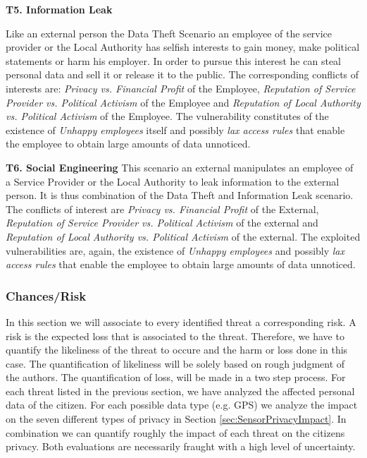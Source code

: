 \documentclass[runningheads,a4paper]{llncs}
\begin{document}
\textbf{T5. Information Leak}

Like an external person the Data Theft Scenario an employee of the
service provider or the Local Authority has selfish interests to gain
money, make political statements or harm his employer.  In order to
pursue this interest he can steal personal data and sell it or release
it to the public.  The corresponding conflicts of interests are:
\textit{Privacy vs. Financial Profit} of the Employee, \textit{Reputation of Service
  Provider vs. Political Activism} of the Employee and \textit{Reputation of Local
  Authority vs. Political Activism} of the Employee.  The vulnerability constitutes of
the existence of \textit{Unhappy employees} itself and possibly \textit{lax access
rules} that enable the employee to obtain large amounts of data
unnoticed.

\textbf{T6. Social Engineering}
This scenario an external manipulates an employee of a Service
Provider or the Local Authority to leak information to the external
person.  It is thus combination of the Data Theft and Information Leak
scenario.
The conflicts of interest are \textit{Privacy vs. Financial Profit} of
the External, \textit{Reputation of Service Provider vs. Political
  Activism} of the external and \textit{Reputation of Local Authority
  vs. Political Activism} of the external.  The exploited
vulnerabilities are, again, the existence of \textit{Unhappy
  employees} and possibly \textit{lax access rules} that enable the
employee to obtain large amounts of data unnoticed.


\subsubsection{Chances/Risk}

In this section we will associate to every identified threat a corresponding risk. A risk is the expected loss that is associated to the threat.
Therefore, we have to quantify the likeliness of the threat to occure and the harm or loss done in this case.
The quantification of likeliness will be solely based on rough judgment of the authors.
The quantification of loss, will be made in a two step process.
For each threat listed in the previous section, we have analyzed the affected personal data of the citizen.
For each possible data type (e.g. GPS) we analyze the impact on the seven different types of privacy in Section \ref{sec:SensorPrivacyImpact}.
In combination we can quantify roughly the impact of each threat on the citizens privacy. Both evaluations are necessarily fraught with a high level of uncertainty.
\end{document}
